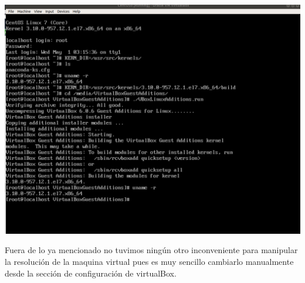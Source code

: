 \documentclass[a4paper, 11pt, oneside]{article}
\begin{document}
\begin{itemize}
    \begin{center}
        \includegraphics[scale=0.27]{additions.png}
    \end{center}
    
    Fuera de lo ya mencionado no tuvimos ningún otro inconveniente para manipular la resolución de la maquina virtual pues es muy sencillo cambiarlo manualmente desde la sección de configuración de virtualBox.
\end{itemize}
\end{document}
